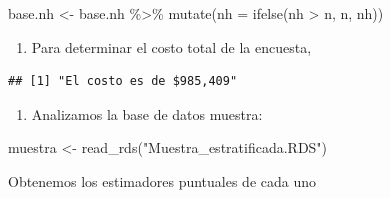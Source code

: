 \documentclass[
]{book}
\newenvironment{Shaded}{\begin{snugshade}}{\end{snugshade}}
\newcommand{\AttributeTok}[1]{\textcolor[rgb]{0.77,0.63,0.00}{#1}}
\newcommand{\DecValTok}[1]{\textcolor[rgb]{0.00,0.00,0.81}{#1}}
\newcommand{\FunctionTok}[1]{\textcolor[rgb]{0.00,0.00,0.00}{#1}}
\newcommand{\NormalTok}[1]{#1}
\newcommand{\OtherTok}[1]{\textcolor[rgb]{0.56,0.35,0.01}{#1}}
\newcommand{\SpecialCharTok}[1]{\textcolor[rgb]{0.00,0.00,0.00}{#1}}
\newcommand{\StringTok}[1]{\textcolor[rgb]{0.31,0.60,0.02}{#1}}
\providecommand{\tightlist}{%
  \setlength{\itemsep}{0pt}\setlength{\parskip}{0pt}}
\begin{document}
\begin{Shaded}
\begin{Highlighting}[]
\NormalTok{base.nh }\OtherTok{\textless{}{-}}\NormalTok{ base.nh }\SpecialCharTok{\%\textgreater{}\%} \FunctionTok{mutate}\NormalTok{(}\AttributeTok{nh =} \FunctionTok{ifelse}\NormalTok{(nh }\SpecialCharTok{\textgreater{}}\NormalTok{ n, n, nh))}
\end{Highlighting}
\end{Shaded}

\begin{enumerate}
\def\labelenumi{\arabic{enumi}.}
\setcounter{enumi}{1}
\tightlist
\item
  Para determinar el costo total de la encuesta,
\end{enumerate}

\begin{Shaded}
\end{Shaded}

\begin{verbatim}
## [1] "El costo es de $985,409"
\end{verbatim}

\begin{enumerate}
\def\labelenumi{\arabic{enumi}.}
\setcounter{enumi}{2}
\tightlist
\item
  Analizamos la base de datos muestra:
\end{enumerate}

\begin{Shaded}
\begin{Highlighting}[]
\NormalTok{muestra }\OtherTok{\textless{}{-}} \FunctionTok{read\_rds}\NormalTok{(}\StringTok{"Muestra\_estratificada.RDS"}\NormalTok{)}
\end{Highlighting}
\end{Shaded}

Obtenemos los estimadores puntuales de cada uno
\end{document}
